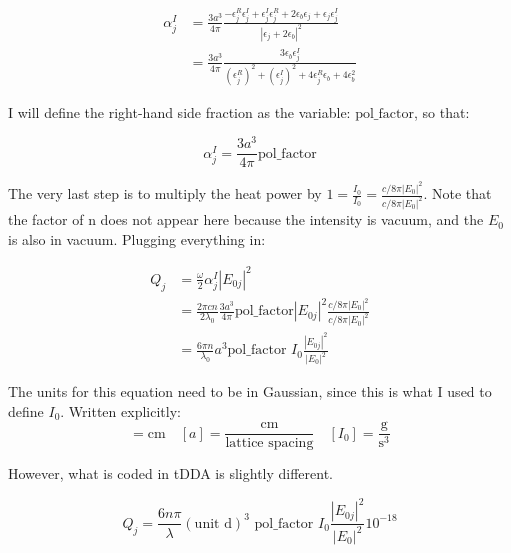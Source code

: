\documentclass[12pt]{article}
\begin{document}
\begin{equation}
\begin{split}
\alpha_j^I &= \frac{3a^3 }{4 \pi}   \frac{-\epsilon_j^R \epsilon_j^I + \epsilon_j ^I \epsilon_j^R + 2 \epsilon_b \epsilon_j + \epsilon_j \epsilon_j^I}{ \left | \epsilon_j + 2 \epsilon_b \right | ^2} \\
&= \frac{3a^3 }{4 \pi} \frac{3 \epsilon_b \epsilon_j^I}{(\epsilon_j^R)^2 + (\epsilon_j^I)^2 + 4 \epsilon_j^R \epsilon_b + 4 \epsilon_b^2}
\end{split}
\end{equation}

I will define the right-hand side fraction as the variable: $\textrm{pol}\_\textrm{factor}$, so that:

\begin{equation}
\alpha_j^I =  \frac{3a^3 }{4 \pi} \textrm{pol}\_\textrm{factor}
\end{equation}

The very last step is to multiply the heat power by $1 = \frac{I_0}{I_0} = \frac{c/8 \pi |E_0|^2 }{c/8 \pi |E_0|^2} $. Note that the factor of n does not appear here because the intensity is vacuum, and the $E_0$ is also in vacuum. Plugging everything in: 

\begin{equation}
\begin{split}
Q_j &= \frac{\omega}{2} \alpha_j^I \left |E_{0j} \right | ^2 \\
&= \frac{2 \pi c n}{2 \lambda_0} \frac{ 3 a ^3}{4 \pi} \textrm{pol}\_\textrm{factor} \left |E_{0j} \right | ^2 \frac{c/8 \pi |E_0|^2 }{c/8 \pi |E_0|^2} \\
&= \frac{6 \pi n}{\lambda_0} a ^3 \textrm{pol}\_\textrm{factor }  I_0 \frac{\left |E_{0j} \right | ^2}{|E_0|^2}
\end{split}
\end{equation}

The units for this equation need to be in Gaussian, since this is what I used to define $I_0$. Written explicitly: 
\begin{equation}
[\lambda ] = \textrm{cm} \quad [a] = \frac{\textrm{cm}}{\textrm{lattice spacing}} \quad [I_0] = \frac{\textrm{g}}{\textrm{s}^3}
\end{equation}

However, what is coded in tDDA is slightly different. 

\begin{equation} 
Q_j = \frac{6 n \pi}{\lambda} (\textrm{unit} \textrm{ d}) ^3 \textrm{ pol}\_\textrm{factor }  I_0 \frac{\left |E_{0j} \right | ^2}{|E_0|^2} 10^{-18}
\end{equation}
\end{document}
